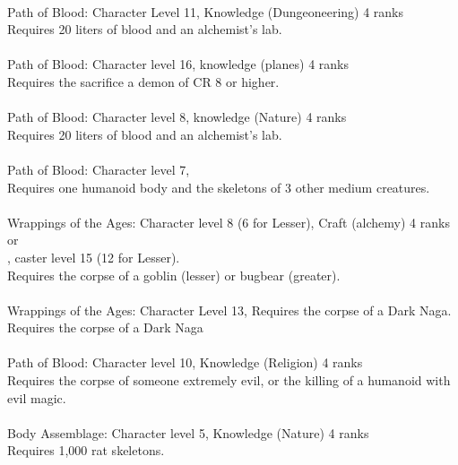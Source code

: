 \begin{multicols}{2}
\begin{small}
\\
Path of Blood: Character Level 11, Knowledge (Dungeoneering) 4 ranks\\
Requires 20 liters of blood and an alchemist's lab.\\
\\
Path of Blood: Character level 16, knowledge (planes) 4 ranks\\
Requires the sacrifice a demon of CR 8 or higher.\\
\\
Path of Blood: Character level 8, knowledge (Nature) 4 ranks\\
Requires 20 liters of blood and an alchemist's lab.\\
\\
Path of Blood: Character level 7, \\
Requires one humanoid body and the skeletons of 3 other medium creatures.\\
\\
Wrappings of the Ages: Character level 8 (6 for Lesser), Craft (alchemy) 4 ranks\\
or\\
, caster level 15 (12 for Lesser).\\
Requires the corpse of a goblin (lesser) or bugbear (greater).\\
\\
Wrappings of the Ages: Character Level 13, Requires the corpse of a Dark Naga.\\
Requires the corpse of a Dark Naga\\
\\
Path of Blood: Character level 10, Knowledge (Religion) 4 ranks\\
Requires the corpse of someone extremely evil, or the killing of a humanoid with evil magic.\\
\\
Body Assemblage: Character level 5, Knowledge (Nature) 4 ranks\\
Requires 1,000 rat skeletons.\\

\end{small}
\end{multicols}
